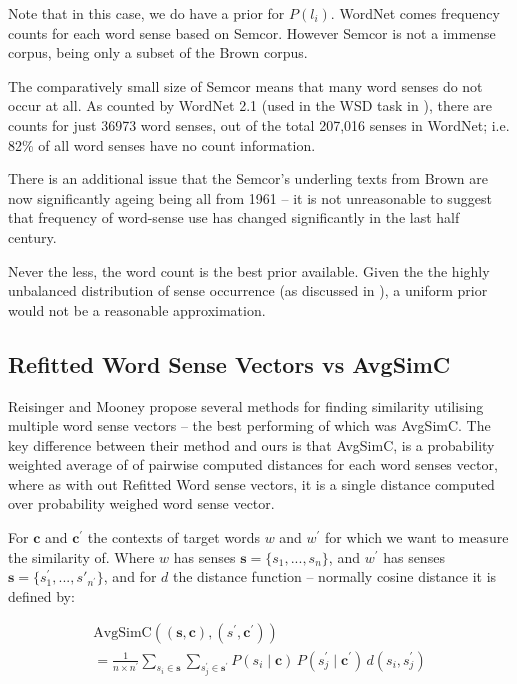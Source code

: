 \documentclass{sig-alternate}
\renewcommand{\c}{\mathbf{c}}
\newcommand{\s}{\mathbf{s}}
\begin{document}
Note that in this case, we do have a prior for $P(l_i)$.
WordNet comes frequency counts for each word sense based on Semcor\cite{tengi1998design}.
However Semcor is not a immense corpus, being only a subset of the Brown corpus.

The comparatively small size of Semcor means that many word senses do not occur at all. As counted by WordNet 2.1 (used in the WSD task in ), there are counts for just  36973 word senses, out of the total 207,016 senses in WordNet; i.e. 82\% of all word senses have no count information. 

There is an additional issue that the Semcor's underling texts from Brown are now significantly ageing being all from 1961 -- it is not unreasonable to suggest that frequency of word-sense use has changed significantly in the last half century.

Never the less, the word count is the best prior available. Given the the highly unbalanced distribution of sense occurrence (as discussed in ),
a uniform prior would not be a reasonable approximation.


\subsection{Refitted Word Sense Vectors vs AvgSimC}\label{RefittedSimVsAvgSimC}
Reisinger and Mooney \cite{Reisinger2010} propose several methods for finding similarity utilising multiple word sense vectors -- the best performing of which was AvgSimC.
The key difference between their method and ours is that AvgSimC, is a probability weighted average of of pairwise computed distances for each word senses vector,
where as with out Refitted Word sense vectors, it is a single distance computed over probability weighed word sense vector.

For $\c$ and $\c^\prime$ the contexts of target words $w$ and $w^\prime$ for which we want to measure the similarity of. Where $w$ has senses $\s=\{s_1,...,s_n\}$, and $w^\prime$ has senses $\s=\{s^\prime_1,...,s\prime_{n^\prime}\}$, and for $d$ the distance function -- normally cosine distance it is defined by:


\begin{multline}
	\mathrm{AvgSimC}((\s,\c),(s^{\prime},\c^{\prime})) \\
	=  \frac{1}{n \times n^{\prime}} 
	\sum_{s_{i}\in\s}
	\sum_{s_{j}^{\prime}\in\s^{\prime}}
	P(s_{i}\mid\c)\,P(s_{j}^{\prime}\mid\c^{\prime})\,d(s_{i},s_{j}^{\prime})
\end{multline}
\end{document}
